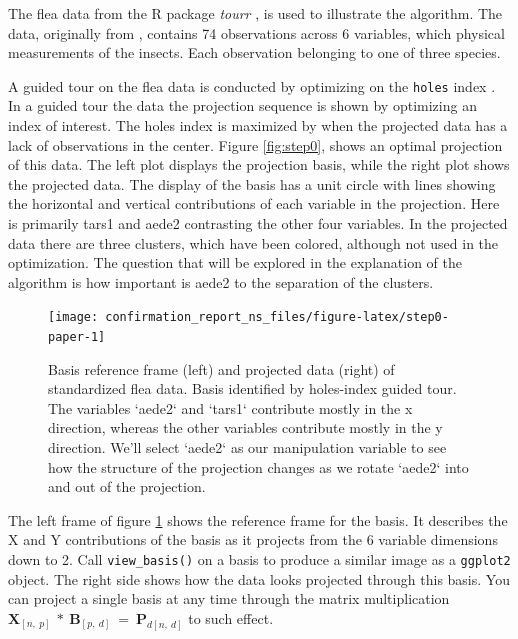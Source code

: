 \documentclass{monashthesis}
\begin{document}
The flea data from the R package \emph{tourr}
\autocite{wickham_tourr_2011}, is used to illustrate the algorithm. The
data, originally from \textcite{lubischew_use_1962}, contains 74
observations across 6 variables, which physical measurements of the
insects. Each observation belonging to one of three species.

A guided tour on the flea data is conducted by optimizing on the
\texttt{holes} index \autocite{cook_interactive_2007}. In a guided tour
the data the projection sequence is shown by optimizing an index of
interest. The holes index is maximized by when the projected data has a
lack of observations in the center. Figure \ref{fig:step0}, shows an
optimal projection of this data. The left plot displays the projection
basis, while the right plot shows the projected data. The display of the
basis has a unit circle with lines showing the horizontal and vertical
contributions of each variable in the projection. Here is primarily
tars1 and aede2 contrasting the other four variables. In the projected
data there are three clusters, which have been colored, although not
used in the optimization. The question that will be explored in the
explanation of the algorithm is how important is aede2 to the separation
of the clusters.

\begin{figure}

{\centering \texttt{[image: confirmation\_report\_ns\_files/figure-latex/step0-paper-1]} 

}

\caption{Basis reference frame (left) and projected data (right) of standardized flea data. Basis identified by holes-index guided tour. The variables `aede2` and `tars1` contribute mostly in the x direction, whereas the other variables contribute mostly in the y direction. We'll select `aede2` as our manipulation variable to see how the structure of the projection changes as we rotate `aede2` into and out of the projection.}\label{fig:step0-paper}
\end{figure}

The left frame of figure \ref{fig:step0-paper} shows the reference frame
for the basis. It describes the X and Y contributions of the basis as it
projects from the 6 variable dimensions down to 2. Call
\texttt{view\_basis()} on a basis to produce a similar image as a
\texttt{ggplot2} object. The right side shows how the data looks
projected through this basis. You can project a single basis at any time
through the matrix multiplication
\(\textbf{X}_{[n,~p]} ~*~ \textbf{B}_{[p,~d]} ~=~ \textbf{P}_{d[n,~d]}\)
to such effect.
\end{document}
